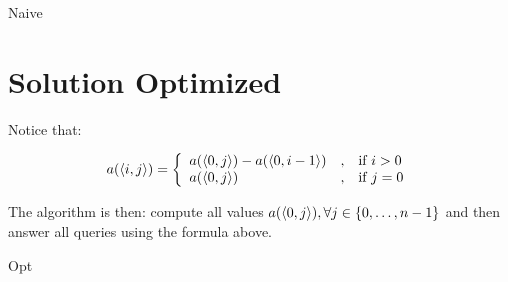 \begin{algorithm}[H]
    \caption{Naive}
    \label{sum-of-the-range:algorithm:naive}
    \begin{algorithmic}[1]
        \EndFor
    \end{algorithmic}
\end{algorithm}

\section{Solution Optimized}

Notice that:

\begin{equation} \label{sum-of-the-range:eq:mathematical-relation}
    a(\left\langle i, j \right\rangle) = \left\lbrace \begin{array}{lll}
        a(\left\langle 0, j \right\rangle) - a(\left\langle 0, i-1 \right\rangle) & , & \mbox{if } i > 0 \\
        a(\left\langle 0, j \right\rangle) & , & \mbox{if } j = 0
    \end{array} \right.
\end{equation}

The algorithm is then: compute all values $a(\left\langle 0, j \right\rangle), \forall j \in \left\{ 0, \dots, n-1 \right\}$ and then answer all queries using the formula above.

\begin{algorithm}[H]
    \caption{Opt}
    \label{sum-of-the-range:algorithm:opt}
    \begin{algorithmic}[1]
        \EndFor
        \EndFor
    \end{algorithmic}
\end{algorithm}
